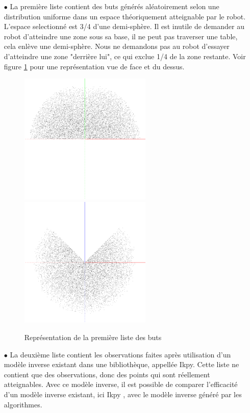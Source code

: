 \documentclass[11pt,french]{report}
\begin{document}
\begin{itemize}
    \item[$\bullet$] La première liste contient des buts générés aléatoirement selon une distribution uniforme dans un espace théoriquement atteignable par le robot.
    L'espace selectionné est 3/4 d'une demi-sphère.
    Il est inutile de demander au robot d'atteindre une zone sous sa base, il ne peut pas traverser une table, cela enlève une demi-sphère.
    Nous ne demandons pas au robot d'essayer d'atteindre une zone "derrière lui", ce qui exclue 1/4 de la zone restante.
    Voir figure \ref{fig:goal_list} pour une représentation vue de face et du dessus.
    
    \begin{figure}
        \centering
        \includegraphics[width=178pt]{goal_list_front} \includegraphics[width=178pt]{goal_list_top}
        \caption{Représentation de la première liste des buts}
        \label{fig:goal_list}
    \end{figure}
    
    \item[$\bullet$] La deuxième liste contient les observations faites après utilisation d'un modèle inverse existant dans une bibliothèque, appellée Ikpy.
    Cette liste ne contient que des observations, donc des points qui sont réellement atteignables.
    Avec ce modèle inverse, il est possible de comparer l'efficacité d'un modèle inverse existant, ici Ikpy \cite{IKPy}, avec le modèle inverse généré par les algorithmes.
\end{itemize}
\end{document}
